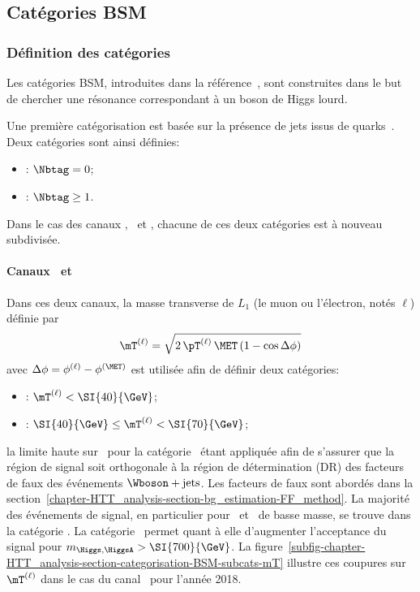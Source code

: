 \subsection{Catégories BSM}\label{chapter-HTT_analysis-section-categorisation-BSM}
\subsubsection{Définition des catégories}
Les catégories BSM, introduites dans la référence~\cite{CMS-PAS-HIG-17-020}, sont construites dans le but de chercher une résonance correspondant à un boson de Higgs lourd.
\par
Une première catégorisation est basée sur la présence de jets issus de quarks~\quarkb.
Deux catégories sont ainsi définies:
\begin{itemize}
\item \CATnobtag: $\Nbtag =0$;
\item \CATbtag: $\Nbtag\geq1$.
\end{itemize}
Dans le cas des canaux \mu\tauh, \ele\tauh\ et \ele\mu, chacune de ces deux catégories est à nouveau subdivisée.
\paragraph{Canaux \mu\tauh\ et \ele\tauh}
Dans ces deux canaux, la masse transverse de $L_1$ (le muon ou l'électron, notés $\ell$) définie par
\begin{equation}
\mT^{(\ell)} = \sqrt{2 \, \pT^{(\ell)} \, \MET \, (1-\cos\Delta\phi)} \label{eq-mT_def-ell}
\end{equation}
avec $\Delta\phi = \phi^{(\ell)} - \phi^{(\MET)}$
est utilisée afin de définir deux catégories:
\begin{itemize}
\item \CATtightmt: $\mT^{(\ell)} < \SI{40}{\GeV}$;
\item \CATloosemt: $\SI{40}{\GeV} \leq \mT^{(\ell)} < \SI{70}{\GeV}$;
\end{itemize}
la limite haute sur \mT\ pour la catégorie \CATloosemt\ étant appliquée afin de s'assurer que la région de signal soit orthogonale à la région de détermination (DR) des facteurs de faux des événements $\Wboson+\text{jets}$.
Les facteurs de faux sont abordés dans la section~\ref{chapter-HTT_analysis-section-bg_estimation-FF_method}.
La majorité des événements de signal, en particulier pour \Higgs\ et \HiggsA\ de basse masse, se trouve dans la catégorie \CATtightmt.
La catégorie \CATloosemt\ permet quant à elle d'augmenter l'acceptance du signal pour $m_{\Higgs,\HiggsA} > \SI{700}{\GeV}$.
La figure~\ref{subfig-chapter-HTT_analysis-section-categorisation-BSM-subcats-mT} illustre ces coupures sur $\mT^{(\ell)}$ dans le cas du canal \ele\tauh\ pour l'année 2018.
